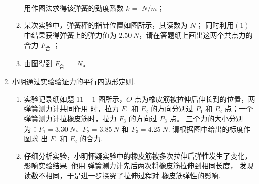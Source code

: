 \begin{enumerate}
\begin{enumerate}
用作图法求得该弹簧的劲度系数 $ k=$  $N/m $；
\begin{figure}[h!]
\centering

\end{figure}



\item 
某次实验中，弹簧秤的指针位置如图所示，其读数为
$ N $；
同时利用$ (1) $中结果获得弹簧上的弹力值为 $ 2.50 \ N $，请在答题纸上画出这两个共点力的合力 $ F_{ \text{合} } $ ；

\banswer{
  
}


\item 
由图得到 $ F _{ \text{合} } = $
$ N $。

\banswer{

}


\end{enumerate}


\newpage
\item
{}
小明通过实验验证力的平行四边形定则.
\begin{figure}[h!]
\centering

\end{figure}

\begin{enumerate}
\renewcommand{\labelenumi}{\arabic{enumi}.}
\item
实验记录纸如题 $ 11-1 $ 图所示，$ O $ 点为橡皮筋被拉伸后伸长到的位置，两弹簧测力计共同作用
时，拉力 $ F_{1} $ 和 $ F_{2} $ 的方向分别过 $ P_{1} $ 和 $ P_{2} $ 点；一个弹簧测力计拉橡皮筋时，拉力 $ F_{3} $ 的方向过 $ P_{3} $
点。 三个力的大小分别为：$ F_{1} =3.30 \ N $、$ F_{2} =3.85 \ N $ 和 $ F_{3} =4.25 \ N $. 请根据图中给出的标度作图求
出 $ F_{1} $ 和 $ F_{2} $ 的合力.



\item 
仔细分析实验，小明怀疑实验中的橡皮筋被多次拉伸后弹性发生了变化，影响实验结果. 他用
弹簧测力计先后两次将橡皮筋拉伸到相同长度， 发现读数不相同，于是进一步探究了拉伸过程对
橡皮筋弹性的影响.


\end{enumerate}
\end{enumerate}
